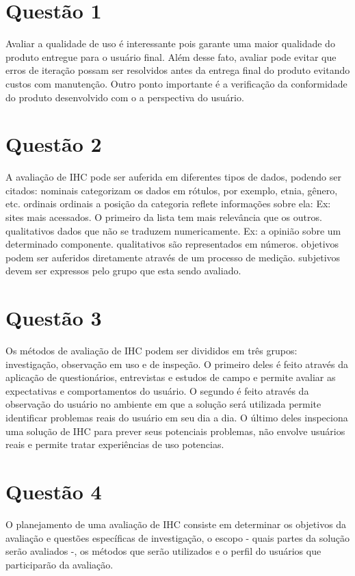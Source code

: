\setcounter{secnumdepth}{0}
\section{Questão 1}
Avaliar a qualidade de uso é interessante pois garante uma maior qualidade
do produto entregue para o usuário final. Além desse fato, avaliar pode evitar
que erros de iteração possam ser resolvidos antes da entrega final do produto
evitando custos com manutenção. Outro ponto importante é a verificação da
conformidade do produto desenvolvido com o a perspectiva do usuário.

\section{Questão 2}
A avaliação de IHC pode ser auferida em diferentes tipos de dados, podendo
ser citados:
    nominais categorizam os dados em rótulos, por exemplo, etnia, gênero, etc.
    ordinais 
    ordinais a posição da categoria reflete informações sobre ela: Ex: sites
    mais acessados. O primeiro da lista tem mais relevância que os outros.
    qualitativos dados que não se traduzem numericamente. Ex: a opinião sobre
    um determinado componente.
    qualitativos são representados em números. 
    objetivos podem ser auferidos diretamente através de um processo de 
    medição.
    subjetivos devem ser expressos pelo grupo que esta sendo avaliado.


\section{Questão 3}
Os métodos de avaliação de IHC podem ser divididos em três grupos: investigação, 
observação em uso e de inspeção. O primeiro deles é feito através da aplicação
de questionários, entrevistas e estudos de campo e permite avaliar as 
expectativas e comportamentos do usuário. O segundo é feito através da 
observação do usuário no ambiente em que a solução será utilizada permite
identificar problemas reais do usuário em seu dia a dia. O último deles
inspeciona uma solução de IHC para prever seus potenciais problemas, não 
envolve usuários reais e permite tratar experiências de uso potencias.


\section{Questão 4}
O planejamento de uma avaliação de IHC consiste em determinar os objetivos
da avaliação e questões específicas de investigação, o escopo - quais partes
da solução serão avaliados -, os métodos que serão utilizados e o perfil 
do usuários que participarão da avaliação. 

